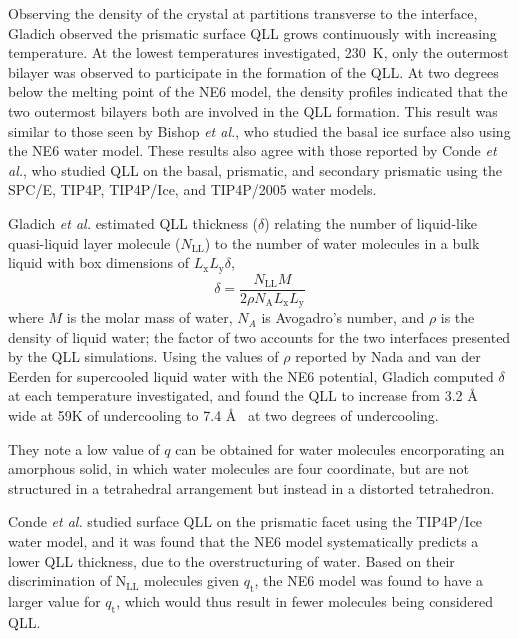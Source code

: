 Observing the density of the crystal at partitions transverse to the
interface, Gladich observed the prismatic surface QLL grows
continuously with increasing temperature. At the lowest temperatures
investigated, 230~K, only the outermost bilayer was observed to
participate in the formation of the QLL. At two degrees below the
melting point of the NE6 model, the density profiles indicated that
the two outermost bilayers both are involved in the QLL
formation. This result was similar to those seen by Bishop \textit{et
  al.}, who studied the basal ice surface also using the NE6 water
model. These results also agree with those reported by Conde
\textit{et al.}, who studied QLL on the basal, prismatic, and
secondary prismatic using the SPC/E, TIP4P, TIP4P/Ice, and TIP4P/2005
water models.\cite{Conde2008} 

Gladich \textit{et al.} estimated QLL thickness ($\delta$) relating
the number of liquid-like quasi-liquid layer molecule
($N_\mathrm{LL}$) to the number of water molecules in a bulk liquid
with box dimensions of $L_\mathrm{x}L_\mathrm{y}\delta$,
\begin{equation}
\delta =
\frac{N_\mathrm{LL}M}{2\rho N_\mathrm{A}L_\mathrm{x}L_\mathrm{y}}
\end{equation}
where $M$ is the molar mass of water, $N_{A}$ is Avogadro's number,
and $\rho$ is the density of liquid water; the factor of two accounts for
the two interfaces presented by the QLL simulations. Using the
values of $\rho$ reported by Nada and van der Eerden for supercooled
liquid water with the NE6 potential,\cite{Nada2003} Gladich computed
$\delta$ at each temperature investigated, and found the QLL to
increase from 3.2 \AA~ wide at 59K of undercooling to 7.4 \AA~ at two
degrees of undercooling.  

They note a low value of $q$ can be obtained for water molecules
encorporating an amorphous solid, in which water molecules are four
coordinate, but are not structured in a tetrahedral arrangement but
instead in a distorted tetrahedron. 

Conde \textit{et al.} studied surface QLL on the prismatic facet using
the TIP4P/Ice water model,\cite{Conde2008} and it was found that the NE6
model systematically predicts a lower QLL thickness, due to the
overstructuring of water. Based on their discrimination of
N$_\mathrm{LL}$ molecules given $q_\mathrm{t}$, the NE6 model was
found to have a larger value for $q_\mathrm{t}$, which would thus
result in fewer molecules being considered QLL.

